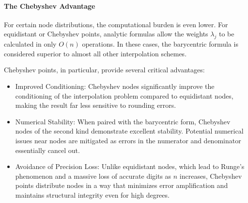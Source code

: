 \paragraph{The Chebyshev Advantage}
For certain node distributions, the computational burden is even lower. For
equidistant or Chebyshev points, analytic formulas allow the
weights $\lambda_j$ to be calculated in only $O(n)$ operations. In these cases,
the barycentric formula is considered superior to almost all other interpolation
schemes.

Chebyshev points, in particular, provide several critical advantages:
\begin{itemize}
	\item Improved Conditioning: Chebyshev nodes significantly improve
	      the conditioning of the interpolation problem compared to equidistant nodes,
	      making the result far less sensitive to rounding errors.
	\item Numerical Stability: When paired with the barycentric form,
	      Chebyshev nodes of the second kind demonstrate excellent stability. Potential
	      numerical issues near nodes are mitigated as errors in the numerator and
	      denominator essentially cancel out.
	\item Avoidance of Precision Loss: Unlike equidistant nodes, which
	      lead to Runge's phenomenon and a massive loss of accurate digits as $n$
	      increases, Chebyshev points distribute nodes in a way that minimizes error
	      amplification and maintains structural integrity even for high degrees.
\end{itemize}




